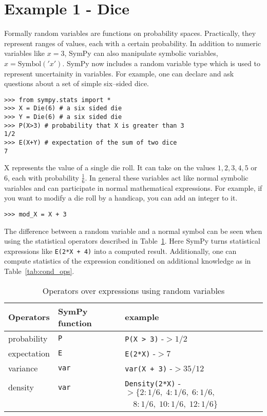 \section{Example 1 - Dice}

Formally random variables are functions on probability spaces.  Practically,
they represent ranges of values, each with a certain probability.  In addition
to numeric variables like $x = 3$, SymPy can also manipulate symbolic
variables, $x = \text{Symbol}('x')$. SymPy now includes a random variable type
which is used to represent uncertainity in variables.  For example, one can
declare and ask questions about a set of simple six--sided dice.

\begin{lstlisting}
>>> from sympy.stats import *
>>> X = Die(6) # a six sided die
>>> Y = Die(6) # a six sided die
>>> P(X>3) # probability that X is greater than 3
1/2
>>> E(X+Y) # expectation of the sum of two dice
7
\end{lstlisting}

X represents the value of a single die roll. It can take on the values
$1,2,3,4,5$ or $6$, each with probability $\frac{1}{6}$. In general these
variables act like normal symbolic variables and can participate in normal
mathematical expressions. For example, if you want to modify a die roll by a
handicap, you can add an integer to it.

\begin{lstlisting}
>>> mod_X = X + 3
\end{lstlisting}

The difference between a random variable and a normal symbol can be seen when
using the statistical operators described in Table~\ref{tab:stat_ops}.  Here
SymPy turns statistical expressions like {\tt E(2*X + 4)} into a computed
result. Additionally, one can compute statistics of the expression conditioned
on additional knowledge as in Table~\ref{tab:cond_ops}.

\begin{table}[h]
\begin{tabular}{|lll|}
\hline
Operators & SymPy function & example\\ \hline
probability & {\tt P} & {\tt P(X > 3)}  -$> 1/2$\\ \hline
expectation & {\tt E} & {\tt E(2*X)}  -$> 7$ \\ \hline
variance & {\tt var} & {\tt var(X + 3)} -$> 35/12$\\ \hline
density & {\tt var} & {\tt Density(2*X)}  -$> \{2: 1/6,\; 4: 1/6,\; 6: 1/6,$ \\
            & & \phantom{Density(X+3)  -$> \{$ } $\quad 8: 1/6,\; 10: 1/6,\; 12: 1/6\}$ \\ \hline
\end{tabular}
\label{tab:stat_ops}
\caption{Operators over expressions using random variables}
\end{table}

